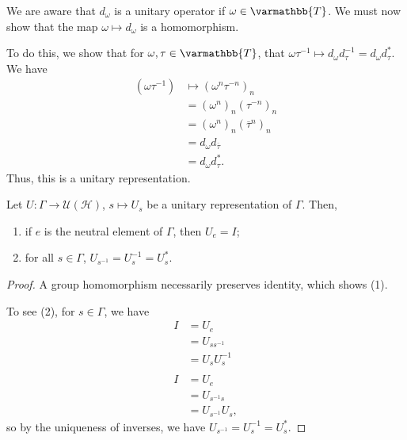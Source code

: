 \documentclass[10pt]{mypackage}
\renewcommand*{\mathbb}[1]{\varmathbb{#1}}
\begin{document}
\begin{solution}
  We are aware that $d_{\omega}$ is a unitary operator if $\omega \in \mathbb{T}$. We must now show that the map $\omega \mapsto d_{\omega}$ is a homomorphism.\newline

  To do this, we show that for $\omega,\tau\in \mathbb{T}$, that $\omega\tau^{-1} \mapsto d_{\omega}d_{\tau}^{-1} = d_{\omega}d_{\tau}^{\ast}$. We have
  \begin{align*}
    \left(\omega\tau^{-1}\right) &\mapsto \left(\omega^n\tau^{-n}\right)_{n}\\
                                 &= \left(\omega^n\right)_{n}\left(\tau^{-n}\right)_n\\
                                 &= \left(\omega^n\right)_{n}\left(\overline{\tau}^n\right)_{n}\\
                                 &= d_{\omega}d_{\overline{\tau}}\\
                                 &= d_{\omega}d_{\tau}^{\ast}.
  \end{align*}
  Thus, this is a unitary representation.
\end{solution}
\begin{fact}
  Let $U: \Gamma\rightarrow \mathcal{U}\left(\mathcal{H}\right)$, $s\mapsto U_s$ be a unitary representation of $\Gamma$. Then,
  \begin{enumerate}[(1)]
    \item if $e$ is the neutral element of $\Gamma$, then $U_e = I$;
    \item for all $s\in \Gamma$, $U_{s^{-1}} = U_{s}^{-1} = U_s^{\ast}$.
  \end{enumerate}
\end{fact}
\begin{proof}
  A group homomorphism necessarily preserves identity, which shows (1).\newline

  To see (2), for $s\in \Gamma$, we have
  \begin{align*}
    I &= U_e\\
      &= U_{ss^{-1}}\\
      &= U_sU_s^{-1}\\
      \\
    I &= U_e\\
      &= U_{s^{-1}s}\\
      &= U_{s^{-1}}U_s,
  \end{align*}
  so by the uniqueness of inverses, we have $U_{s^{-1}} = U_s^{-1} = U_s^{\ast}$.
\end{proof}
\end{document}
